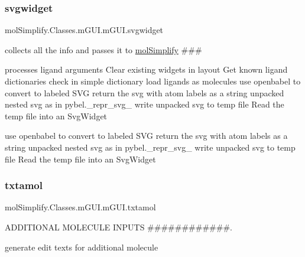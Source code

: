 \subsubsection{\texorpdfstring{svgwidget}{svgwidget}}
{\footnotesize\ttfamily mol\+Simplify.\+Classes.\+m\+G\+U\+I.\+m\+G\+U\+I.\+svgwidget}



collects all the info and passes it to \hyperlink{namespacemolSimplify}{mol\+Simplify} \#\#\# 

processes ligand arguments Clear existing widgets in layout Get known ligand dictionaries check in simple dictionary load ligands as molecules use openbabel to convert to labeled S\+VG return the svg with atom labels as a string unpacked nested svg as in pybel.\+\_\+repr\+\_\+svg\+\_\+ write unpacked svg to temp file Read the temp file into an Svg\+Widget

use openbabel to convert to labeled S\+VG return the svg with atom labels as a string unpacked nested svg as in pybel.\+\_\+repr\+\_\+svg\+\_\+ write unpacked svg to temp file Read the temp file into an Svg\+Widget \mbox{\label{classmolSimplify_1_1Classes_1_1mGUI_1_1mGUI_ad48db2ddd60ff53ed1ac966804f8290e}} 
\subsubsection{\texorpdfstring{txtamol}{txtamol}}
{\footnotesize\ttfamily mol\+Simplify.\+Classes.\+m\+G\+U\+I.\+m\+G\+U\+I.\+txtamol\hspace{0.3cm}{\ttfamily [static]}}



A\+D\+D\+I\+T\+I\+O\+N\+AL M\+O\+L\+E\+C\+U\+LE I\+N\+P\+U\+TS \#\#\#\#\#\#\#\#\#\#\#\#. 

generate edit texts for additional molecule \mbox{\label{classmolSimplify_1_1Classes_1_1mGUI_1_1mGUI_a921b0efa8adec33b5a49e1912f19980b}} 
